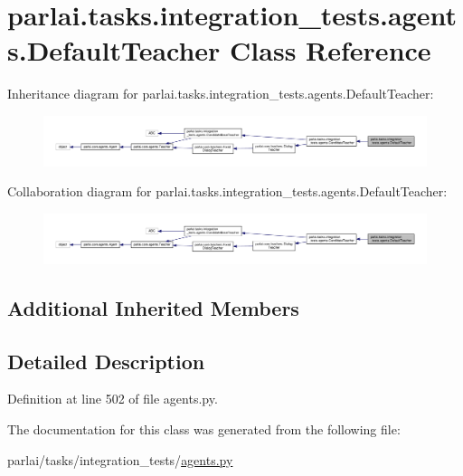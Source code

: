 \hypertarget{classparlai_1_1tasks_1_1integration__tests_1_1agents_1_1DefaultTeacher}{}\section{parlai.\+tasks.\+integration\+\_\+tests.\+agents.\+Default\+Teacher Class Reference}
\label{classparlai_1_1tasks_1_1integration__tests_1_1agents_1_1DefaultTeacher}


Inheritance diagram for parlai.\+tasks.\+integration\+\_\+tests.\+agents.\+Default\+Teacher\+:\nopagebreak
\begin{figure}[H]
\begin{center}
\leavevmode
\includegraphics[width=350pt]{d9/daf/classparlai_1_1tasks_1_1integration__tests_1_1agents_1_1DefaultTeacher__inherit__graph}
\end{center}
\end{figure}


Collaboration diagram for parlai.\+tasks.\+integration\+\_\+tests.\+agents.\+Default\+Teacher\+:\nopagebreak
\begin{figure}[H]
\begin{center}
\leavevmode
\includegraphics[width=350pt]{d9/de7/classparlai_1_1tasks_1_1integration__tests_1_1agents_1_1DefaultTeacher__coll__graph}
\end{center}
\end{figure}
\subsection*{Additional Inherited Members}


\subsection{Detailed Description}


Definition at line 502 of file agents.\+py.



The documentation for this class was generated from the following file\+:\begin{DoxyCompactItemize}
\item 
parlai/tasks/integration\+\_\+tests/\hyperlink{parlai_2tasks_2integration__tests_2agents_8py}{agents.\+py}\end{DoxyCompactItemize}
